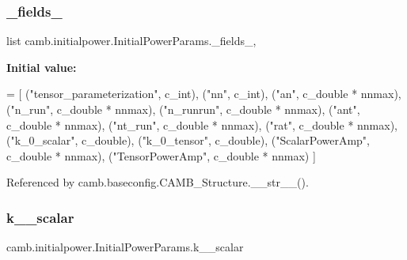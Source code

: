 \subsubsection{\texorpdfstring{\+\_\+fields\+\_\+}{\_fields\_}}
{\footnotesize\ttfamily list camb.\+initialpower.\+Initial\+Power\+Params.\+\_\+fields\+\_\+\hspace{0.3cm}{\ttfamily [static]}, {\ttfamily [private]}}

{\bfseries Initial value\+:}
\begin{DoxyCode}
=  [
        (\textcolor{stringliteral}{"tensor\_parameterization"}, c\_int),
        (\textcolor{stringliteral}{"nn"}, c\_int),
        (\textcolor{stringliteral}{"an"}, c\_double * nnmax),
        (\textcolor{stringliteral}{"n\_run"}, c\_double * nnmax),
        (\textcolor{stringliteral}{"n\_runrun"}, c\_double * nnmax),
        (\textcolor{stringliteral}{"ant"}, c\_double * nnmax),
        (\textcolor{stringliteral}{"nt\_run"}, c\_double * nnmax),
        (\textcolor{stringliteral}{"rat"}, c\_double * nnmax),
        (\textcolor{stringliteral}{"k\_0\_scalar"}, c\_double),
        (\textcolor{stringliteral}{"k\_0\_tensor"}, c\_double),
        (\textcolor{stringliteral}{"ScalarPowerAmp"}, c\_double * nnmax),
        (\textcolor{stringliteral}{"TensorPowerAmp"}, c\_double * nnmax)
    ]
\end{DoxyCode}


Referenced by camb.\+baseconfig.\+C\+A\+M\+B\+\_\+\+Structure.\+\_\+\+\_\+str\+\_\+\+\_\+().

\mbox{\label{classcamb_1_1initialpower_1_1InitialPowerParams_ac3fbb18abfbd776bbd1c6f787d72af31}} 
\subsubsection{\texorpdfstring{k\+\_\+\_\+scalar}{k\_0\_scalar}}
{\footnotesize\ttfamily camb.\+initialpower.\+Initial\+Power\+Params.\+k\+\_\+\_\+scalar}

\mbox{\label{classcamb_1_1initialpower_1_1InitialPowerParams_a9a9e09ac537ae5a70ceadcf83ba5febe}} 
